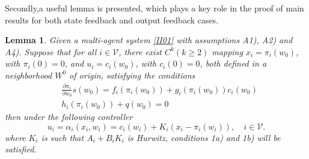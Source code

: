 \documentclass[onecolumn,a4paper,12pt]{article}
\newtheorem{lemma}{Lemma}
\numberwithin{equation}{section}
\begin{document}
Secondly,a useful lemma is presented, which plays a key role in the proof of main results for both state feedback and output feedback cases.
\begin{lemma}
  \label{le03}
Given a multi-agent system \eqref{II01} with assumptions A1), A2) and A4). Suppose that for all $i\in\mathcal{V}$, there exist $C^k(k\ge 2)$ mapping $x_i=\pi_i(w_0)$, with $\pi_i(0)=0$, and $u_i=c_i(w_0)$, with $c_i(0)=0$, both defined in a neighborhood $W^0$ of origin, satisfying the conditions
\begin{subequations} \label{III09}
\begin{align}
 \label{III09a} &\frac{\partial \pi_i}{\partial w_0} s(w_0) = f_i(\pi_i(w_0))+g_i(\pi_i(w_0))c_i(w_0) \\
 \label{III09b} &h_i(\pi_i(w_0))+q(w_0)=0
\end{align}
\end{subequations}
then under the following controller
\begin{equation}
  \label{III10}
  u_i = \alpha_i(x_i,w_i)=c_i(w_i)+K_i(x_i-\pi_i(w_i)), \quad i\in\mathcal{V}.
\end{equation}
where $K_i$ is such that $A_i+B_iK_i$ is Hurwitz, conditions 1a) and 1b) will be satisfied.
\end{lemma}
\end{document}
